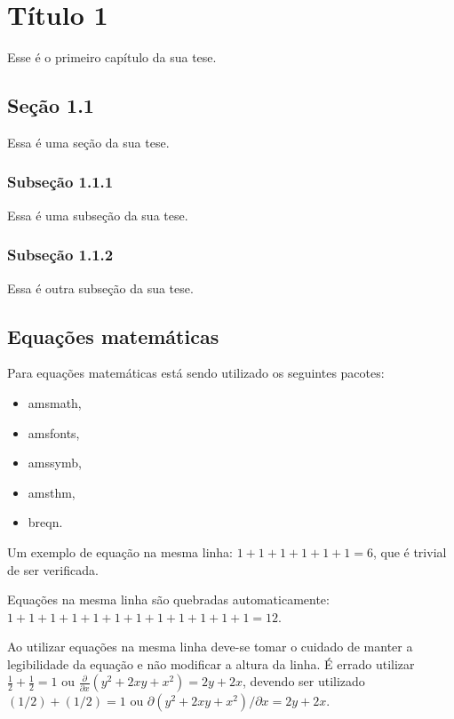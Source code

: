 \chapter{T\'itulo 1}
Esse \'e o primeiro cap\'itulo da sua tese.

\section{Se\c c\~ao 1.1}
Essa \'{e} uma se\c{c}\~{a}o da sua tese.

\subsection{Subse\c{c}\~{a}o 1.1.1}

Essa \'{e} uma subse\c{c}\~{a}o da sua tese.

\subsection{Subse\c{c}\~{a}o 1.1.2}

Essa \'{e} outra subse\c{c}\~{a}o da sua tese.

\section{Equa\c{c}\~{o}es matem\'{a}ticas}
Para equa\c{c}\~{o}es matem\'{a}ticas est\'{a} sendo utilizado os seguintes
pacotes:
\begin{itemize}
  \item amsmath,
  \item amsfonts,
  \item amssymb,
  \item amsthm,
  \item breqn.
\end{itemize}

Um exemplo de equa\c{c}\~{a}o na mesma linha: 
$ 1 + 1 + 1 + 1 + 1 + 1 = 6$, 
que \'{e} trivial de ser verificada.

Equa\c{c}\~{o}es na mesma linha s\~{a}o quebradas automaticamente:
$ 1 + 1 + 1 + 1 + 1 + 1 + 1 + 1 + 1 + 1 + 1 + 1 = 12$. 

Ao utilizar equa\c{c}\~{o}es na mesma linha deve-se tomar o cuidado de manter a
legibilidade da equa\c{c}\~{a}o e n\~{a}o modificar a altura da linha. \'{E}
errado utilizar $\frac{1}{2} + \frac{1}{2} = 1$ ou $\frac{\partial}{\partial x}
(y^2 + 2xy + x^2) = 2y + 2x$, devendo ser utilizado $(1/2) + (1/2) = 1$ ou
$\partial (y^2 + 2 x y + x^2) / \partial x = 2 y + 2 x$.

